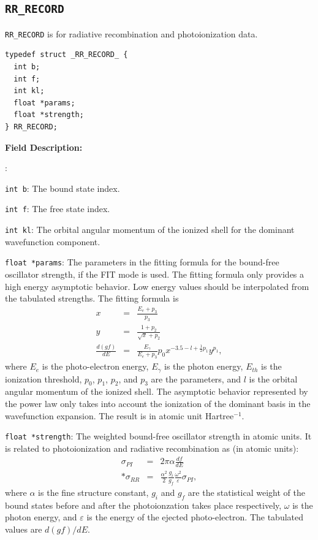 \documentclass[twoside,letterpaper]{refrep}
\newenvironment{dbdesc}{\textbf{Field Description:} \begin{list}
	{:}{\setlength{\labelwidth}{2in}
	   \setlength{\leftmargin}{2in}
	   \setlength{\labelsep}{0.1in}
	   \setlength{\rightmargin}{0.2in}}}
	{\end{list}}
\begin{document}
\subsection{\texttt{RR\_RECORD}}
\texttt{RR\_RECORD} is for radiative recombination and photoionization data.

\begin{verbatim}
typedef struct _RR_RECORD_ {
  int b;
  int f;
  int kl;
  float *params;
  float *strength;
} RR_RECORD;
\end{verbatim}

\begin{dbdesc}
\item[\texttt{int b}:] The bound state index.
\item[\texttt{int f}:] The free state index.
\item[\texttt{int kl}:] The orbital angular momentum of the ionized shell for
the dominant wavefunction component.
\item[\texttt{float *params}:] The parameters in the fitting formula for the
bound-free oscillator strength, if the FIT mode is
used. The fitting formula only provides a high energy asymptotic behavior. Low
energy values should be interpolated from the tabulated strengths. The fitting
formula is
\begin{eqnarray}
x &=& \frac{E_e+p_3}{p_3} \nonumber\\
y &=& \frac{1+p_2}{\sqrt{x}+p_2} \nonumber\\
\frac{d(gf)}{dE} &=&
\frac{E_\gamma}{E_e+p_3}p_0x^{-3.5-l+\frac{1}{2}p_1}y^{p_1}, 
\end{eqnarray}
where $E_e$ is the photo-electron energy, $E_\gamma$ is the photon energy,
$E_{th}$ is the ionization threshold, $p_0$, $p_1$, $p_2$, and $p_3$ are the
parameters, and $l$ is the orbital angular momentum of the ionized
shell. The asymptotic behavior represented by the power law only takes into
account the ionization of the dominant basis in the wavefunction
expansion. The result is in atomic unit Hartree$^{-1}$.
\item[\texttt{float *strength}:] The weighted bound-free oscillator strength in
atomic units. It is related to photoionization and radiative recombination as
(in atomic units):
\begin{eqnarray}
\sigma_{PI} &=& 2\pi\alpha\frac{ d f}{ d E} \nonumber\\*
\sigma_{RR} &=& \frac{\alpha^2}{2}\frac{g_i}{g_f}\frac{\omega^2}{\varepsilon}
\sigma_{PI},
\end{eqnarray}
where $\alpha$ is the fine structure constant, $g_i$ and $g_f$ are the
statistical weight of the bound states before and after the photoionzation
takes place respectively, $\omega$ is the photon energy, and $\varepsilon$ is
the energy of the ejected photo-electron. The tabulated values are $d(gf)/dE$.
\end{dbdesc}
\end{document}
